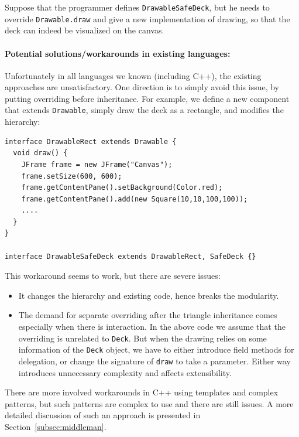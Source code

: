 Suppose that the programmer defines \lstinline|DrawableSafeDeck|, but he needs to override
\lstinline|Drawable.draw| and give a new implementation of drawing, so that the deck can indeed be visualized on the canvas.


\paragraph{Potential solutions/workarounds in existing languages:} Unfortunately in all languages we known
(including C++), the existing approaches are unsatisfactory.
One direction is to simply avoid this issue, by putting overriding before inheritance. For example, we define a new component
that extends \lstinline|Drawable|, simply draw the deck as a rectangle, and modifies the hierarchy:
\vspace{3pt}\begin{lstlisting}
interface DrawableRect extends Drawable {
  void draw() {
    JFrame frame = new JFrame("Canvas");
    frame.setSize(600, 600);
    frame.getContentPane().setBackground(Color.red);
    frame.getContentPane().add(new Square(10,10,100,100));
    ....
  }
}

interface DrawableSafeDeck extends DrawableRect, SafeDeck {}
\end{lstlisting} \vspace{3pt}
This workaround seems to work, but there are severe issues:
\begin{itemize}
	\item It changes the hierarchy and existing code, hence breaks the modularity.
	\item The demand for separate overriding after the triangle
          inheritance comes especially when there is
          interaction. In the above code we assume
	that the overriding is unrelated to \lstinline|Deck|. But when the drawing relies on some information of the \lstinline|Deck|
	object, we have to either introduce field methods for delegation, or change the signature of \lstinline|draw| to take a parameter.
	Either way introduces unnecessary complexity and affects extensibility.
\end{itemize}

There are more involved workarounds in C++ using templates and complex
patterns, but such patterns are complex to use and there are still issues. A more detailed discussion of
such an approach is presented in Section~\ref{subsec:middleman}.

